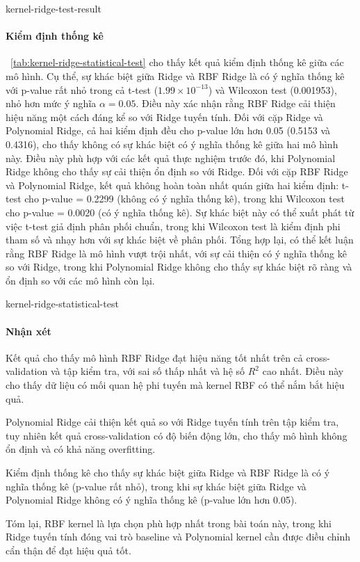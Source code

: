 \begin{table}[htbp]
  \caption{Kết quả trên tập kiểm tra}
  \label{tab:kernel-ridge-test-result}
  \centering
  {kernel-ridge-test-result}
\end{table}

\paragraph{Kiểm định thống kê}

\tablename~\ref{tab:kernel-ridge-statistical-test} cho thấy kết quả kiểm định
thống kê giữa các mô hình. Cụ thể, sự khác biệt giữa Ridge và RBF Ridge là có
ý nghĩa thống kê với p-value rất nhỏ trong cả t-test ($1.99 \times 10^{-13}$)
và Wilcoxon test (0.001953), nhỏ hơn mức ý nghĩa $\alpha = 0.05$. Điều này xác
nhận rằng RBF Ridge cải thiện hiệu năng một cách đáng kể so với Ridge tuyến
tính. Đối với cặp Ridge và Polynomial Ridge, cả hai kiểm định đều cho p-value
lớn hơn 0.05 (0.5153 và 0.4316), cho thấy không có sự khác biệt có ý nghĩa
thống kê giữa hai mô hình này. Điều này phù hợp với các kết quả thực nghiệm
trước đó, khi Polynomial Ridge không cho thấy sự cải thiện ổn định so với
Ridge. Đối với cặp RBF Ridge và Polynomial Ridge, kết quả không hoàn toàn nhất
quán giữa hai kiểm định: t-test cho p-value = 0.2299 (không có ý nghĩa thống
kê), trong khi Wilcoxon test cho p-value = 0.0020 (có ý nghĩa thống kê). Sự
khác biệt này có thể xuất phát từ việc t-test giả định phân phối chuẩn, trong
khi Wilcoxon test là kiểm định phi tham số và nhạy hơn với sự khác biệt về phân
phối. Tổng hợp lại, có thể kết luận rằng RBF Ridge là mô hình vượt trội nhất,
với sự cải thiện có ý nghĩa thống kê so với Ridge, trong khi Polynomial Ridge
không cho thấy sự khác biệt rõ ràng và ổn định so với các mô hình còn lại.

\begin{table}[htbp]
  \caption{So sánh thống kê giữa các mô hình}
  \label{tab:kernel-ridge-statistical-test}
  \centering
  {kernel-ridge-statistical-test}
\end{table}

\paragraph{Nhận xét}

Kết quả cho thấy mô hình RBF Ridge đạt hiệu năng tốt nhất trên cả cross-
validation và tập kiểm tra, với sai số thấp nhất và hệ số $R^2$ cao nhất. Điều
này cho thấy dữ liệu có mối quan hệ phi tuyến mà kernel RBF có thể nắm bắt
hiệu quả.

Polynomial Ridge cải thiện kết quả so với Ridge tuyến tính trên tập kiểm tra,
tuy nhiên kết quả cross-validation có độ biến động lớn, cho thấy mô hình không
ổn định và có khả năng overfitting.

Kiểm định thống kê cho thấy sự khác biệt giữa Ridge và RBF Ridge là có ý nghĩa
thống kê (p-value rất nhỏ), trong khi sự khác biệt giữa Ridge và Polynomial
Ridge không có ý nghĩa thống kê (p-value lớn hơn 0.05).

Tóm lại, RBF kernel là lựa chọn phù hợp nhất trong bài toán này, trong khi
Ridge tuyến tính đóng vai trò baseline và Polynomial kernel cần được điều
chỉnh cẩn thận để đạt hiệu quả tốt.
